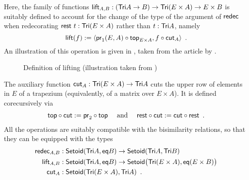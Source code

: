 \documentclass[a4paper,USenglish]{lipics}
\begin{document}
\begin{ex}
    
Here, the family of functions 
     $\extend_{A,B} : (\Tri A \to B) \to \Tri (E \times A) \to E\times B $
  is suitably defined to account for the change of the type of the argument of $\redec$ when redecorating $\tail~t : \Tri(E\times A)$
  rather than $t : \Tri A$, namely
  \[ \extend(f) := \langle \comp{\head_{E\times A}}{\pr_1(E,A)} , \comp{\cut_A}{f} \rangle \enspace . \]
  An illustration of this operation is given in , 
  taken from the article by \textcite{DBLP:conf/types/MatthesP11}.    
  \begin{figure}[tbp]
  \centering
  \vspace{-3ex}
  \caption{Definition of lifting (illustration taken from \parencite{DBLP:conf/types/MatthesP11})}
  \label{fig:lift}
\end{figure}
% 
  The auxiliary function $\cut_A : \Tri(E\times A) \to \Tri A$ cuts the upper row of elements in $E$ of a trapezium (equivalently, of a matrix over $E\times A$).
  It is defined corecursively via
% 
  \begin{align*} \comp{\cut}{\head} := \comp{\head}{\pr_2} \quad\text{ and } \quad
                     \comp{\cut}{\tail} := \comp{\tail}{\cut} \enspace . 
      \end{align*}
%       
All the operations are suitably compatible with the bisimilarity relations, so that they can be equipped with the types
  \begin{align*}
    \redec_{A,B} &: \Setoid(\Tri A,\eq B) \to \Setoid(\Tri A,\Tri B ) \\
    \extend_{A,B} &: \Setoid(\Tri A,\eq B) \to \Setoid\bigr(\Tri (E \times A),\eq(E\times B)\bigr) \\
    \cut_A &:  \Setoid(\Tri(E\times A) , \Tri A) \enspace .
  \end{align*}
\end{ex}
\end{document}
